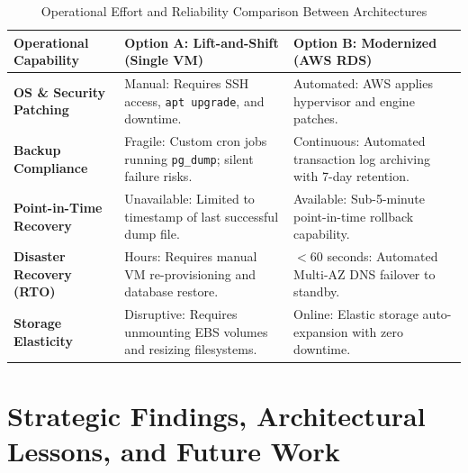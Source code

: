 \documentclass[11pt,a4paper]{article}
\begin{document}
\begin{table}[htbp]
\centering
\small
\caption{Operational Effort and Reliability Comparison Between Architectures}
\label{tab:operational_effort}
\begin{tabularx}{\textwidth}{p{3.8cm}X X}
\toprule
\textbf{Operational Capability} & \textbf{Option A: Lift-and-Shift (Single VM)} & \textbf{Option B: Modernized (AWS RDS)} \\
\midrule
\textbf{OS \& Security Patching} & Manual: Requires SSH access, \texttt{apt upgrade}, and downtime. & Automated: AWS applies hypervisor and engine patches. \\
\addlinespace
\textbf{Backup Compliance} & Fragile: Custom cron jobs running \texttt{pg\_dump}; silent failure risks. & Continuous: Automated transaction log archiving with 7-day retention. \\
\addlinespace
\textbf{Point-in-Time Recovery} & Unavailable: Limited to timestamp of last successful dump file. & Available: Sub-5-minute point-in-time rollback capability. \\
\addlinespace
\textbf{Disaster Recovery (RTO)} & Hours: Requires manual VM re-provisioning and database restore. & $<60$ seconds: Automated Multi-AZ DNS failover to standby. \\
\addlinespace
\textbf{Storage Elasticity} & Disruptive: Requires unmounting EBS volumes and resizing filesystems. & Online: Elastic storage auto-expansion with zero downtime. \\
\bottomrule
\end{tabularx}
\end{table}

\newpage

\section{Strategic Findings, Architectural Lessons, and Future Work}
\end{document}

